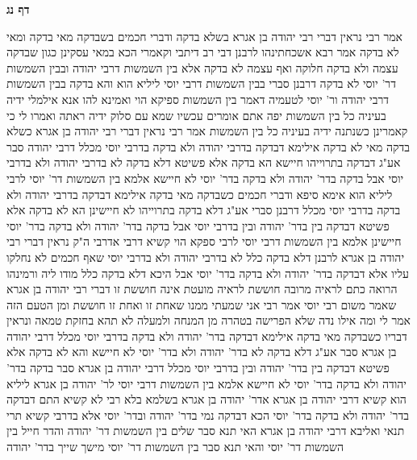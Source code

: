 \documentclass[12pt, openany]{book}
\newcommand{\sethebfont}{
\fontsize{10.5pt}{21.0pt} \selectfont
}
\newcommand{\twocol}[1]{
	{\sethebfont \begin{multicols}{2}
			#1
	\end{multicols}}	
}
\newcommand{\sectname}{}
\newcommand{\newsection}[1]{
	\addcontentsline{toc}{section}{#1}
	\renewcommand{\sectname}{#1}	
	\vspace{-\baselineskip}
	\begin{center}
		\textbf{%
\fontsize{16pt}{16pt}\selectfont
			#1}
	\end{center}
	\vspace{-\baselineskip}
	\nopagebreak
}
\begin{document}
\newsection{דף נג}
\twocol{אמר רבי  נראין דברי רבי יהודה בן אגרא בשלא בדקה ודברי חכמים בשבדקה 
מאי בדקה ומאי לא בדקה  אמר רבא אשכחתינהו לרבנן דבי רב דיתבי וקאמרי  הכא במאי עסקינן כגון שבדקה עצמה ולא בדקה חלוקה ואף עצמה לא בדקה אלא בין השמשות דרבי יהודה ובבין השמשות דר' יוסי לא בדקה 
דרבנן סברי בבין השמשות דרבי יוסי ליליא הוא והא בדקה בבין השמשות דרבי יהודה  ור' יוסי לטעמיה דאמר בין השמשות ספיקא הוי 
ואמינא להו אנא  אילמלי ידיה בעיניה כל בין השמשות יפה אתם אומרים עכשיו שמא עם סלוק ידיה ראתה  ואמרו לי  כי קאמרינן כשנתנה ידיה בעיניה כל בין השמשות 
אמר רבי  נראין דברי רבי יהודה בן אגרא כשלא בדקה  מאי לא בדקה 
אילימא דבדקה בדרבי יהודה ולא בדקה בדרבי יוסי מכלל דרבי יהודה סבר אע"ג דבדקה בתרוייהו חיישא  הא בדקה 
אלא פשיטא דלא בדקה לא בדרבי יהודה ולא בדרבי יוסי אבל בדקה בדר' יהודה ולא בדקה בדר' יוסי לא חיישא 
אלמא  בין השמשות דר' יוסי לרבי ליליא הוא  אימא סיפא ודברי חכמים כשבדקה  מאי בדקה 
אילימא דבדקה בדרבי יהודה ולא בדקה בדרבי יוסי מכלל דרבנן סברי אע"ג דלא בדקה בתרוייהו לא חיישינן הא לא בדקה 
אלא פשיטא דבדקה בין בדר' יהודה ובין בדרבי יוסי אבל בדקה בדר' יהודה ולא בדקה בדר' יוסי חיישינן 
אלמא  בין השמשות דרבי יוסי לרבי ספקא הוי  קשיא דרבי אדרבי 
ה"ק  נראין דברי רבי יהודה בן אגרא לרבנן דלא בדקה כלל לא בדרבי יהודה ולא בדרבי יוסי שאף חכמים לא נחלקו עליו אלא דבדקה בדר' יהודה ולא בדקה בדר' יוסי  אבל היכא דלא בדקה כלל מודו ליה 
ורמינהו  הרואה כתם לראיה מרובה חוששת לראיה מועטת אינה חוששת זו דברי רבי יהודה בן אגרא שאמר משום רבי יוסי 
אמר רבי אני שמעתי ממנו שאחת זו ואחת זו חוששת ומן הטעם הזה אמר לי  ומה אילו נדה שלא הפרישה בטהרה מן המנחה ולמעלה לא תהא בחזקת טמאה  ונראין דבריו כשבדקה 
מאי בדקה  אילימא דבדקה בדר' יהודה ולא בדקה בדרבי יוסי מכלל דרבי יהודה בן אגרא סבר אע"ג דלא בדקה לא בדר' יהודה ולא בדר' יוסי לא חיישא  והא לא בדקה 
אלא פשיטא דבדקה בין בדר' יהודה ובין בדרבי יוסי מכלל דרבי יהודה בן אגרא סבר  בדקה בדר' יהודה ולא בדקה בדר' יוסי לא חיישא
אלמא  בין השמשות דרבי יוסי לר' יהודה בן אגרא ליליא הוא  קשיא דרבי יהודה בן אגרא אדר' יהודה בן אגרא 
בשלמא בלא רבי לא קשיא התם דבדקה בדר' יהודה ולא בדקה בדר' יוסי הכא דבדקה נמי בדר' יהודה ובדר' יוסי אלא בדרבי קשיא 
תרי תנאי ואליבא דרבי יהודה בן אגרא האי תנא סבר  שלים בין השמשות דר' יהודה
והדר חייל בין השמשות דר' יוסי  והאי תנא סבר  בין השמשות דר' יוסי מישך שייך בדר' יהודה 
}
\end{document}
